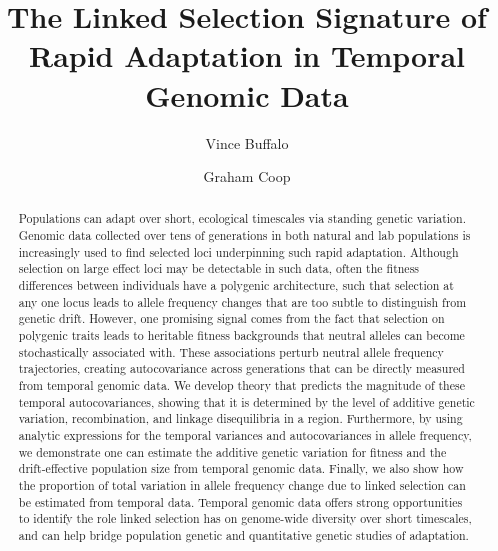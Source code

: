 \documentclass[11pt]{article}
\title{The Linked Selection Signature of Rapid Adaptation in Temporal Genomic Data}
\author[$\ast$,$\dag$,$1$]{Vince Buffalo}
\author[$\dag$]{Graham Coop}
\affil[$\ast$]{\footnotesize Population Biology Graduate Group}
\affil[$\dag$]{\footnotesize Center for Population Biology, Department of Evolution and Ecology, University of California, Davis, CA 95616}
\affil[$1$]{\footnotesize Email for correspondence: \href{mailto:vsbuffalo@ucdavis.edu}{vsbuffalo@ucdavis.edu}}
\begin{document}
\maketitle



\linenumbers
\begin{abstract}
  Populations can adapt over short, ecological timescales via standing genetic
  variation. Genomic data collected over tens of generations in both natural
  and lab populations is increasingly used to find selected loci underpinning
  such rapid adaptation. Although selection on large effect loci may be
  detectable in such data, often the fitness differences between individuals
  have a polygenic architecture, such that selection at any one locus leads to
  allele frequency changes that are too subtle to distinguish from genetic
  drift. However, one promising signal comes from the fact that selection on
  polygenic traits leads to heritable fitness backgrounds that neutral alleles
  can become stochastically associated with. These associations perturb neutral
  allele frequency trajectories, creating autocovariance across generations
  that can be directly measured from temporal genomic data. We develop theory
  that predicts the magnitude of these temporal autocovariances, showing that
  it is determined by the level of additive genetic variation, recombination,
  and linkage disequilibria in a region. Furthermore, by using analytic
  expressions for the temporal variances and autocovariances in allele
  frequency, we demonstrate one can estimate the additive genetic variation for
  fitness and the drift-effective population size from temporal genomic data.
  Finally, we also show how the proportion of total variation in allele
  frequency change due to linked selection can be estimated from temporal data.
  Temporal genomic data offers strong opportunities to identify the role linked
  selection has on genome-wide diversity over short timescales, and can help
  bridge population genetic and quantitative genetic studies of adaptation.

\end{abstract}
\end{document}
